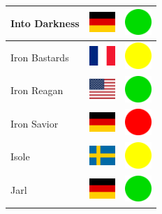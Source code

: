 \documentclass[12pt, a4paper, twoside]{report}
\begin{document}
\begin{center}
\begin{longtable}{|p{5cm}|p{2cm}|p{2cm}|}
Into Darkness & \includegraphics[width=1cm]{4x3/de} & \includegraphics[width=1cm]{likes/y} \\ \hline
Iron Bastards & \includegraphics[width=1cm]{4x3/fr} & \includegraphics[width=1cm]{likes/m} \\ \hline
Iron Reagan & \includegraphics[width=1cm]{4x3/us} & \includegraphics[width=1cm]{likes/y} \\ \hline
Iron Savior & \includegraphics[width=1cm]{4x3/de} & \includegraphics[width=1cm]{likes/n} \\ \hline
Isole & \includegraphics[width=1cm]{4x3/se} & \includegraphics[width=1cm]{likes/m} \\ \hline
Jarl & \includegraphics[width=1cm]{4x3/de} & \includegraphics[width=1cm]{likes/y} \\ \hline

\end{longtable}
\end{center}
\end{document}

